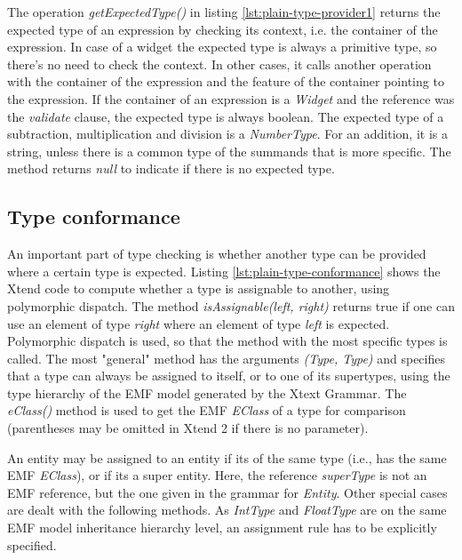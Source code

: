 

The operation \emph{getExpectedType()} in listing \ref{lst:plain-type-provider1} returns the expected type of an expression by checking its context, i.e. the container of the expression. In case of a widget the expected type is always a primitive type, so there's no need to check the context. In other cases, it calls another operation with the container of the expression and the feature of the container pointing to the expression. If the container of an expression is a \emph{Widget} and the reference was the \emph{validate} clause, the expected type is always boolean. The expected type of a subtraction, multiplication and division is a \emph{NumberType}. For an addition, it is a string, unless there is a common type of the summands that is more specific. The method returns \emph{null} to indicate if there is no expected type.

%

\subsection{Type conformance}
An important part of type checking is whether another type can be provided where a certain type is expected.
Listing \ref{lst:plain-type-conformance} shows the Xtend code to compute whether a type is assignable to another, using polymorphic dispatch. The method \emph{isAssignable(left, right)} returns true if one can use an element of type \emph{right} where an element of type \emph{left} is expected. Polymorphic dispatch is used, so that the method with the most specific types is called. The most "general" method has the arguments \emph{(Type, Type)} and specifies that a type can always be assigned to itself, or to one of its supertypes, using the type hierarchy of the EMF model generated by the Xtext Grammar. The \emph{eClass()} method is used to get the EMF \emph{EClass} of a type for comparison (parentheses may be omitted in Xtend 2 if there is no parameter).

An entity may be assigned to an entity if its of the same type (i.e., has the same EMF \emph{EClass}), or if its a super entity. Here, the reference \emph{superType} is not an EMF reference, but the one given in the grammar for \emph{Entity}. Other special cases are dealt with the following methods. As \emph{IntType} and \emph{FloatType} are on the same EMF model inheritance hierarchy level, an assignment rule has to be explicitly specified.

